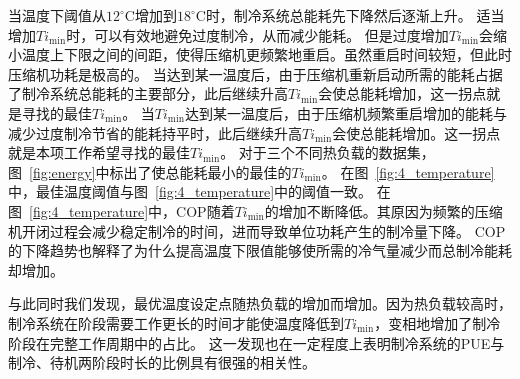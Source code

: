 当温度下阈值从${12}^{\circ} \mathrm{C}$增加到${18}^{\circ} \mathrm{C}$时，制冷系统总能耗先下降然后逐渐上升。
适当增加$Ti_{\min}$时，可以有效地避免过度制冷，从而减少能耗。
但是过度增加$Ti_{\min}$会缩小温度上下限之间的间距，使得压缩机更频繁地重启。虽然重启时间较短，但此时压缩机功耗是极高的。
当达到某一温度后，由于压缩机重新启动所需的能耗占据了制冷系统总能耗的主要部分，此后继续升高$Ti_{\min}$会使总能耗增加，这一拐点就是寻找的最佳$Ti_{\min}$。
当$Ti_{\min}$达到某一温度后，由于压缩机频繁重启增加的能耗与减少过度制冷节省的能耗持平时，此后继续升高$Ti_{\min}$会使总能耗增加。这一拐点就是本项工作希望寻找的最佳$Ti_{\min}$。
对于三个不同热负载的数据集，图~\ref{fig:energy}中标出了使总能耗最小的最佳的$Ti_{\min}$。
在图~\ref{fig:4_temperature}中，最佳温度阈值与图~\ref{fig:4_temperature}中的阈值一致。
在图~\ref{fig:4_temperature}中，COP随着$Ti_{\min}$的增加不断降低。其原因为频繁的压缩机开闭过程会减少稳定制冷的时间，进而导致单位功耗产生的制冷量下降。
COP的下降趋势也解释了为什么提高温度下限值能够使所需的冷气量减少而总制冷能耗却增加。

与此同时我们发现，最优温度设定点随热负载的增加而增加。因为热负载较高时，制冷系统在阶段需要工作更长的时间才能使温度降低到$Ti_{\min}$，变相地增加了制冷阶段在完整工作周期中的占比。
这一发现也在一定程度上表明制冷系统的PUE与制冷、待机两阶段时长的比例具有很强的相关性。

